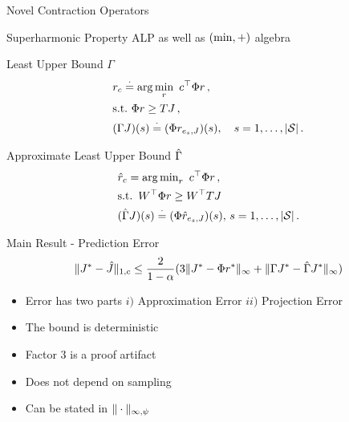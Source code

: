 \documentclass[10pt,handout]{beamer}
\begin{document}
\begin{frame}[fragile]{Novel Contraction Operators}

\begin{block}{Superharmonic Property}
ALP as well as $(\min,+)$ algebra
\end{block}
\begin{block}{Least Upper Bound $\Gamma$}
\begin{align*}
\begin{split}
&r_c\stackrel{\cdot}{=}\arg\min_{r} \,\, c^\top \Phi r\,,\\
&\text{s.t.} \mbox{ } \Phi r\geq  TJ\,,\\
&(\Gamma J)(s)\stackrel{\cdot}{=}(\Phi r_{e_s,J})(s),\quad s=1,\ldots,|\mathcal{S}|\,.
\end{split}
\end{align*}
\end{block}

\begin{block}{Approximate Least Upper Bound $\hat{\Gamma}$}
\begin{align*}
&\hat{r}_c={\arg\min}_{r} \,\mbox{ } c^\top \Phi r\,,\\
&\text{s.t.} \,\,\, W^\top  \Phi r\geq W^\top TJ\,\\
&(\hat{\Gamma} J)(s)\stackrel{\cdot}{=}(\Phi \hat{r}_{e_s,J})(s),\, s=1,\ldots,|\mathcal{S}|\,.
\end{align*}
\end{block}
\end{frame}


\begin{frame}[fragile]{Main Result - Prediction Error}
\begin{align*}
\|J^*-\hat{J}\|_{1,c}\leq \frac{2}{1-\alpha}( 3\|J^*-\Phi r^*\|_{\infty}+ \|\Gamma J^*-\hat{\Gamma} J^*\|_{\infty})
\end{align*}
\begin{itemize}
\item Error has two parts $i)$ Approximation Error $ii)$ Projection Error
\item The bound is deterministic
\item Factor $3$ is a proof artifact
\item Does not depend on sampling
\item Can be stated in $\|\cdot\|_{\infty,\psi}$
\end{itemize}
\end{frame}
\end{document}
